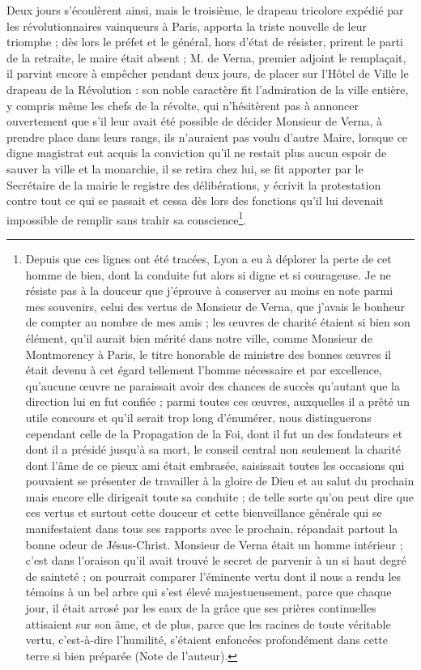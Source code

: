 \documentclass[11pt,a4paper]{report}
\begin{document}
Deux jours s'écoulèrent ainsi, mais le troisième, le drapeau tricolore expédié par les révolutionnaires vainqueurs à Paris, apporta la triste nouvelle de leur triomphe ; dès lors le préfet et le général, hors d'état de résister, prirent le parti de la retraite, le maire était absent ; M. de Verna, premier adjoint le remplaçait, il parvint encore à empêcher pendant deux jours, de placer sur l'Hôtel de Ville le drapeau de la Révolution : son noble caractère fit l'admiration de la ville entière, y compris même les chefs de la révolte, qui n'hésitèrent pas à annoncer ouvertement que s'il leur avait été possible de décider Monsieur de Verna, à prendre place dans leurs rangs, ils n'auraient pas voulu d'autre Maire, lorsque ce digne magistrat eut acquis la conviction qu'il ne restait plus aucun espoir de sauver la ville et la monarchie, il se retira chez lui, se fit apporter par le Secrétaire de la mairie le registre des délibérations, y écrivit la protestation contre tout ce qui se passait et cessa dès lors des fonctions qu'il lui devenait impossible de remplir sans trahir sa conscience\footnote{Depuis que ces lignes ont été tracées, Lyon a eu à déplorer la perte de cet homme de bien, dont la conduite fut alors si digne et si courageuse. Je ne résiste pas à la douceur que j'éprouve à conserver au moins en note parmi mes souvenirs, celui des vertus de Monsieur de Verna, que j'avais le bonheur de compter au nombre de mes amis ; les œuvres de charité étaient si bien son élément, qu'il aurait bien mérité dans notre ville, comme Monsieur de Montmorency à Paris, le titre honorable de ministre des bonnes œuvres il était devenu à cet égard tellement l'homme nécessaire et par excellence, qu'aucune œuvre ne paraissait avoir des chances de succès qu'autant que la direction lui en fut confiée ; parmi toutes ces œuvres, auxquelles il a prêté un utile concours et qu'il serait trop long d'énumérer, nous distinguerons cependant celle de la Propagation de la Foi, dont il fut un des fondateurs et dont il a présidé jusqu'à sa mort, le conseil central non seulement la charité dont l'âme de ce pieux ami était embrasée, saisissait toutes les occasions qui pouvaient se présenter de travailler à la gloire de Dieu et au salut du prochain mais encore elle dirigeait toute sa conduite ; de telle sorte qu'on peut dire que ces vertus et surtout cette douceur et cette bienveillance générale qui se manifestaient dans tous ses rapports avec le prochain, répandait partout la bonne odeur de Jésus-Christ. Monsieur de Verna était un homme intérieur ; c'est dans l'oraison qu'il avait trouvé le secret de parvenir à un si haut degré de sainteté ; on pourrait comparer l'éminente vertu dont il nous a rendu les témoins à un bel arbre qui s'est élevé majestueusement, parce que chaque jour, il était arrosé par les eaux de la grâce que ses prières continuelles attisaient sur son âme, et de plus, parce que les racines de toute véritable vertu, c'est-à-dire l'humilité, s'étaient enfoncées profondément dans cette terre si bien préparée (Note de l'auteur).}.
\end{document}
